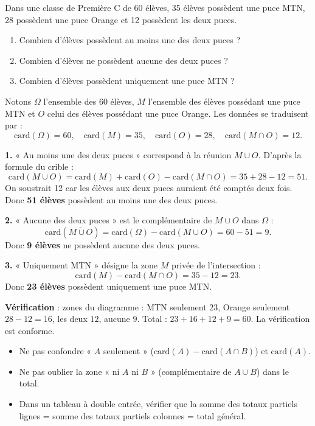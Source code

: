 \documentclass[11pt]{article}
\begin{document}
\begin{exoresolu}
Dans une classe de Première C de 60 élèves, 35 élèves possèdent une puce MTN, 28 possèdent une puce Orange et 12 possèdent les deux puces.
\begin{enumerate}
\item Combien d'élèves possèdent au moins une des deux puces ?
\item Combien d'élèves ne possèdent aucune des deux puces ?
\item Combien d'élèves possèdent uniquement une puce MTN ?
\end{enumerate}
\tcblower
Notons $\Omega$ l'ensemble des 60 élèves, $M$ l'ensemble des élèves possédant une puce MTN et $O$ celui des élèves possédant une puce Orange. Les données se traduisent par :
\[ \mathrm{card}(\Omega)=60,\quad \mathrm{card}(M)=35,\quad \mathrm{card}(O)=28,\quad \mathrm{card}(M\cap O)=12. \]

\textbf{1.} « Au moins une des deux puces » correspond à la réunion $M\cup O$. D'après la formule du crible :
\[ \mathrm{card}(M\cup O)=\mathrm{card}(M)+\mathrm{card}(O)-\mathrm{card}(M\cap O)=35+28-12=51. \]
On soustrait 12 car les élèves aux deux puces auraient été comptés deux fois. Donc \textbf{51 élèves} possèdent au moins une des deux puces.

\textbf{2.} « Aucune des deux puces » est le complémentaire de $M\cup O$ dans $\Omega$ :
\[ \mathrm{card}\left(\overline{M\cup O}\right)=\mathrm{card}(\Omega)-\mathrm{card}(M\cup O)=60-51=9. \]
Donc \textbf{9 élèves} ne possèdent aucune des deux puces.

\textbf{3.} « Uniquement MTN » désigne la zone $M$ privée de l'intersection :
\[ \mathrm{card}(M)-\mathrm{card}(M\cap O)=35-12=23. \]
Donc \textbf{23 élèves} possèdent uniquement une puce MTN.

\textbf{Vérification} : zones du diagramme : MTN seulement $23$, Orange seulement $28-12=16$, les deux $12$, aucune $9$. Total : $23+16+12+9=60$. La vérification est conforme.
\end{exoresolu}

\begin{attention}
\begin{itemize}
\item Ne pas confondre « $A$ seulement » ($\mathrm{card}(A)-\mathrm{card}(A\cap B)$) et $\mathrm{card}(A)$.
\item Ne pas oublier la zone « ni $A$ ni $B$ » (complémentaire de $A\cup B$) dans le total.
\item Dans un tableau à double entrée, vérifier que la somme des totaux partiels lignes = somme des totaux partiels colonnes = total général.
\end{itemize}
\end{attention}
\end{document}
